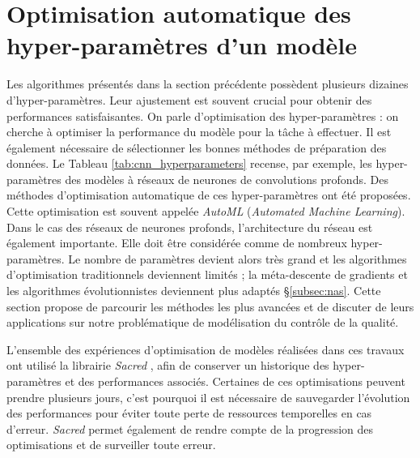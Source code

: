 
\section{Optimisation automatique des hyper-paramètres d'un modèle} \label{sec:auto_ml}
Les algorithmes présentés dans la section précédente possèdent plusieurs dizaines d'hyper-paramètres.
Leur ajustement est souvent crucial pour obtenir des performances satisfaisantes.
On parle d'optimisation des hyper-paramètres : on cherche à optimiser la performance du modèle pour la tâche à effectuer.
Il est également nécessaire de sélectionner les bonnes méthodes de préparation des données.
Le Tableau \ref{tab:cnn_hyperparameters} recense, par exemple, les hyper-paramètres des modèles à réseaux de neurones de convolutions profonds.
Des méthodes d'optimisation automatique de ces hyper-paramètres ont été proposées.
Cette optimisation est souvent appelée \textit{AutoML} (\textit{Automated Machine Learning}).
Dans le cas des réseaux de neurones profonds, l'architecture du réseau est également importante.
Elle doit être considérée comme de nombreux hyper-paramètres.
Le nombre de paramètres devient alors très grand et les algorithmes d'optimisation traditionnels deviennent limités ; la méta-descente de gradients et les algorithmes évolutionnistes deviennent plus adaptés §\ref{subsec:nas}.
Cette section propose de parcourir les méthodes les plus avancées et de discuter de leurs applications sur notre problématique de modélisation du contrôle de la qualité.

L'ensemble des expériences d'optimisation de modèles réalisées dans ces travaux ont utilisé la librairie \textit{Sacred} \cite{greff_sacred_2017}, afin de conserver un historique des hyper-paramètres et des performances associés.
Certaines de ces optimisations peuvent prendre plusieurs jours, c'est pourquoi il est nécessaire de sauvegarder l'évolution des performances pour éviter toute perte de ressources temporelles en cas d'erreur.
\textit{Sacred} permet également de rendre compte de la progression des optimisations et de surveiller toute erreur.

